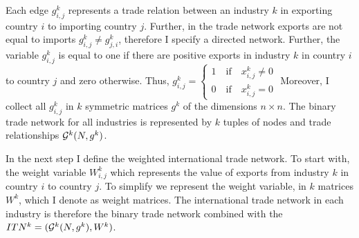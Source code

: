 Each edge $g_{i,j}^k $ represents a trade relation between an industry $k$ in exporting country $i$ to importing country $j$.
Further, in the trade network exports are not equal to imports $g_{i,j}^k \neq g_{j,i}^k$, therefore I specify a directed network.
Further, the variable $g_{i,j}^k$ is equal to one if there are positive exports in industry $k$ in country $i$ to country $j$ and zero otherwise.
Thus,
$g_{i,j}^k = \begin{cases}
 1 \quad \text{if} \quad x_{i,j}^k \neq 0 \\
0 \quad \text{if} \quad x_{i,j}^k = 0 \end{cases} $
Moreover, I collect all $g_{i,j}^k$ in $k$ symmetric matrices  $g^k$  of the dimensions $n \times n$.
 The binary trade network for all industries is represented by $k$ tuples of nodes and trade relationships $\mathcal{G}^k(N, g^k)$. \par
In the next step I define the weighted international trade network. To start with, the
weight variable $W_{i,j}^k$ which represents the value of exports from industry $k$  in country $i$ to country $j$.
To simplify we represent the weight variable, in $k$  matrices $W^k$, which I denote as weight matrices. %
 The international trade network in each industry is therefore the binary trade network combined with the  $ITN^k =( \mathcal{G}^k(N, g^k),W^k)$.
